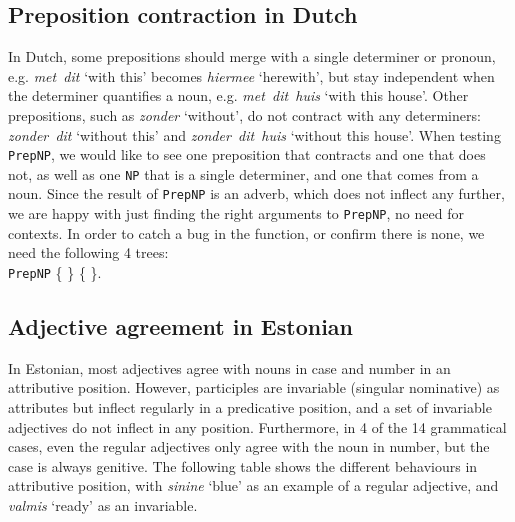 \documentclass[11pt]{article}
\def\t#1{\texttt{#1}}
\begin{document}
\subsection{Preposition contraction in Dutch} In Dutch, some prepositions should
merge with a single determiner or pronoun, e.g. \emph{met~dit} `with
this' becomes \emph{hiermee} `herewith', but stay independent when the
determiner quantifies a noun, e.g. \emph{met~dit~huis} `with this house'. 
Other prepositions, such as \emph{zonder} `without', do not
contract with any determiners: \emph{zonder~dit} `without this' and
\emph{zonder~dit~huis} `without this house'.
When testing \t{PrepNP}, we would like to see one preposition that
contracts and one that does not, as well as one \t{NP} that is a
single determiner, and one that comes from a noun. Since the result of
\t{PrepNP} is an adverb, which does not inflect any further, we are
happy with just finding the right arguments to \t{PrepNP}, no need for contexts.
In order to catch a bug in the function, or confirm there is none, we
need the following 4 trees: \\
\t{PrepNP} \{  \} 
           \{  \}. 

\subsection{Adjective agreement in Estonian} In Estonian,
most adjectives agree with nouns in case and number in an attributive
position. However, participles are invariable (singular nominative) as 
attributes but inflect regularly in a predicative position, and a set
of invariable adjectives do not inflect in any position. Furthermore,
in 4 of the 14 grammatical cases, even the regular adjectives only
agree with the noun in number, but the case is always genitive.
The following table shows the different behaviours in attributive
position, with \emph{sinine} `blue' as an example of a regular
adjective, and \emph{valmis} `ready' as an invariable.
\end{document}
